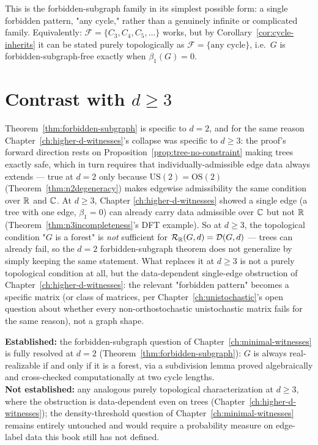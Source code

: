 \begin{remark}
This is the forbidden-subgraph family in its simplest possible form: a
single forbidden pattern, "any cycle," rather than a genuinely infinite or
complicated family. Equivalently: $\mathcal F = \{C_3, C_4, C_5,\dots\}$
works, but by Corollary~\ref{cor:cycle-inherits} it can be stated purely
topologically as $\mathcal F = \{\text{any cycle}\}$, i.e.\ $G$ is
forbidden-subgraph-free exactly when $\beta_1(G)=0$.
\end{remark}

\section{Contrast with \texorpdfstring{$d\ge3$}{d>=3}}

\begin{remark}

Theorem~\ref{thm:forbidden-subgraph} is specific to $d=2$, and for the same
reason Chapter~\ref{ch:higher-d-witnesses}'s collapse was specific to
$d\ge3$: the proof's forward direction rests on
Proposition~\ref{prop:tree-no-constraint} making trees exactly safe, which
in turn requires that individually-admissible edge data always extends —
true at $d=2$ only because $\mathrm{US}(2)=\mathrm{OS}(2)$
(Theorem~\ref{thm:n2degeneracy}) makes edgewise admissibility the same
condition over $\mathbb{R}$ and $\mathbb{C}$. At $d\ge3$, Chapter
\ref{ch:higher-d-witnesses} showed a single edge (a tree with one edge,
$\beta_1=0$) can already carry data admissible over $\mathbb{C}$ but not $\mathbb{R}$
(Theorem~\ref{thm:n3incompleteness}'s DFT example). So at $d\ge3$, the
topological condition "$G$ is a forest" is \emph{not} sufficient for
$\mathcal R_{\mathbb{R}}(G,d)=\mathcal D(G,d)$ — trees can already fail, so the
$d=2$ forbidden-subgraph theorem does not generalize by simply keeping the
same statement. What replaces it at $d\ge3$ is not a purely topological
condition at all, but the data-dependent single-edge obstruction of
Chapter~\ref{ch:higher-d-witnesses}: the relevant "forbidden pattern"
becomes a specific matrix (or class of matrices, per
Chapter~\ref{ch:unistochastic}'s open question about whether every
non-orthostochastic unistochastic matrix fails for the same reason), not a
graph shape.
\end{remark}

\begin{ledgerentry}
\textbf{Established:} the forbidden-subgraph question of
Chapter~\ref{ch:minimal-witnesses} is fully resolved at $d=2$
(Theorem~\ref{thm:forbidden-subgraph}): $G$ is always real-realizable if
and only if it is a forest, via a subdivision lemma proved algebraically
and cross-checked computationally at two cycle lengths.\\
\textbf{Not established:} any analogous purely topological
characterization at $d\ge3$, where the obstruction is data-dependent even
on trees (Chapter~\ref{ch:higher-d-witnesses}); the density-threshold
question of Chapter~\ref{ch:minimal-witnesses} remains entirely untouched
and would require a probability measure on edge-label data this book still
has not defined.
\end{ledgerentry}
